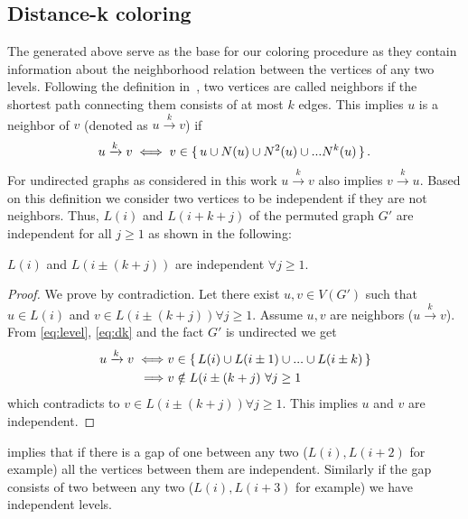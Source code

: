  \subsection{Distance-k coloring} \label{subsec:DK}
 The \levels generated above serve as the base for our \DK coloring procedure as they contain information about the neighborhood relation between the vertices of any two levels. Following the definition in~\cite{dist_k_def}, two vertices are called \DK neighbors if the shortest path connecting them consists of at most $k$ edges.
This implies $u$ is a \DK neighbor of $v$ (denoted as $u\xrightarrow{k}v$)  if
 \begin{equation}\label{eq:dk}
	  u\xrightarrow{k}v  \iff  v \in \set{ u \cup N(u) \cup N^2(u) \cup ... N^k(u) }.	 
 \end{equation}
 For undirected graphs as considered in this work  $u\xrightarrow{k}v$ also implies $v\xrightarrow{k}u$. Based on this definition we consider two vertices to be \DK independent if they are not \DK neighbors. Thus,  \levels $L(i)$ and $L(i+k+j)$  of the permuted graph $G'$ are \DK independent for all $j\geq1$ as shown in the following:
  \begin{corollary}\label{corollary_dk}
   $L(i)$ and $L(i\pm(k+j))$ are \DK independent $\forall j\geq1$. 
  \end{corollary}
  \begin{proof}
  	We prove by contradiction. Let there exist $u,v \in V(G')$ such that  $u \in L(i)$ and $v \in  L(i \pm (k+j)) \forall j\geq1$. Assume $u,v$ are \DK neighbors ($u\xrightarrow{k}v$). From \cref{eq:level}, \cref{eq:dk} and the fact $G'$ is undirected we get 
  	\begin{align*}
	  	u\xrightarrow{k}v \iff & v \in \set{L(i) \cup L(i \pm 1) \cup ... \cup L(i \pm k)} \\
	  	\implies & v \notin L(i \pm (k+j) \text{  } \forall j \geq 1
  	\end{align*}
  	which contradicts to $v \in L(i \pm (k+j) ) \forall j \geq 1$. This implies $u$ and $v$ are \DK independent.
  \end{proof}

 implies that if there is a gap of \emph{\atleast} one \level between any two \levels ($L(i), L(i+2)$ for example) all the vertices between them are \DONE independent. Similarly if the gap consists of \emph{\atleast} two \levels between any two \levels ($L(i), L(i+3)$ for example) we have \DTWO independent levels.
  
